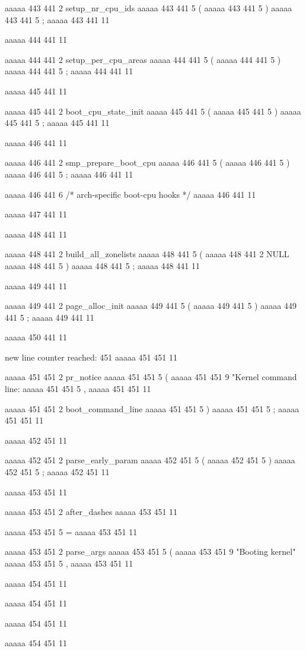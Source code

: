 {aaaaa 443 441
2
setup_nr_cpu_ids
aaaaa 443 441
5
(
aaaaa 443 441
5
)
aaaaa 443 441
5
;
aaaaa 443 441
11


aaaaa 444 441
11
	
aaaaa 444 441
2
setup_per_cpu_areas
aaaaa 444 441
5
(
aaaaa 444 441
5
)
aaaaa 444 441
5
;
aaaaa 444 441
11


aaaaa 445 441
11
	
aaaaa 445 441
2
boot_cpu_state_init
aaaaa 445 441
5
(
aaaaa 445 441
5
)
aaaaa 445 441
5
;
aaaaa 445 441
11


aaaaa 446 441
11
	
aaaaa 446 441
2
smp_prepare_boot_cpu
aaaaa 446 441
5
(
aaaaa 446 441
5
)
aaaaa 446 441
5
;
aaaaa 446 441
11
	
aaaaa 446 441
6
/* arch-specific boot-cpu hooks */
aaaaa 446 441
11


aaaaa 447 441
11


aaaaa 448 441
11
	
aaaaa 448 441
2
build_all_zonelists
aaaaa 448 441
5
(
aaaaa 448 441
2
NULL
aaaaa 448 441
5
)
aaaaa 448 441
5
;
aaaaa 448 441
11


aaaaa 449 441
11
	
aaaaa 449 441
2
page_alloc_init
aaaaa 449 441
5
(
aaaaa 449 441
5
)
aaaaa 449 441
5
;
aaaaa 449 441
11


aaaaa 450 441
11


new line counter reached: 451
aaaaa 451 451
11
	
aaaaa 451 451
2
pr_notice
aaaaa 451 451
5
(
aaaaa 451 451
9
"Kernel command line: %
aaaaa 451 451
5
,
aaaaa 451 451
11
 
aaaaa 451 451
2
boot_command_line
aaaaa 451 451
5
)
aaaaa 451 451
5
;
aaaaa 451 451
11


aaaaa 452 451
11
	
aaaaa 452 451
2
parse_early_param
aaaaa 452 451
5
(
aaaaa 452 451
5
)
aaaaa 452 451
5
;
aaaaa 452 451
11


aaaaa 453 451
11
	
aaaaa 453 451
2
after_dashes
aaaaa 453 451
11
 
aaaaa 453 451
5
=
aaaaa 453 451
11
 
aaaaa 453 451
2
parse_args
aaaaa 453 451
5
(
aaaaa 453 451
9
"Booting kernel"
aaaaa 453 451
5
,
aaaaa 453 451
11


aaaaa 454 451
11
	
aaaaa 454 451
11
	
aaaaa 454 451
11
	
aaaaa 454 451
11
	
}
